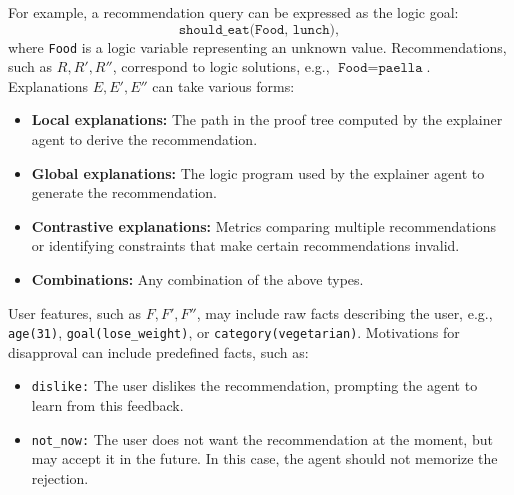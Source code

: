 For example, a recommendation query can be expressed as the logic goal:
%
\[
\texttt{should\_eat(Food, lunch)},
\]
%
where \texttt{Food} is a logic variable representing an unknown value.
%
Recommendations, such as \( R, R', R'' \), correspond to logic solutions, e.g., \(\texttt{Food} = \texttt{paella}\).
%
Explanations \( E, E', E'' \) can take various forms:
%
\begin{itemize}
    \item \textbf{Local explanations:} The path in the proof tree computed by the explainer agent to derive the recommendation.
    \item \textbf{Global explanations:} The logic program used by the explainer agent to generate the recommendation.
    \item \textbf{Contrastive explanations:} Metrics comparing multiple recommendations or identifying constraints that make certain recommendations invalid.
    \item \textbf{Combinations:} Any combination of the above types.
\end{itemize}

User features, such as \( F, F', F'' \), may include raw facts describing the user, e.g., \texttt{age(31)}, \texttt{goal(lose\_weight)}, or \texttt{category(vegetarian)}.
%
Motivations for disapproval can include predefined facts, such as:
%
\begin{itemize}
    \item \texttt{dislike:} The user dislikes the recommendation, prompting the agent to learn from this feedback.
    \item \texttt{not\_now:} The user does not want the recommendation at the moment, but may accept it in the future.
    In this case, the agent should not memorize the rejection.
\end{itemize}


